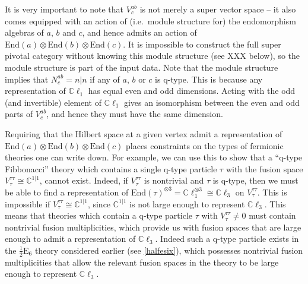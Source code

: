 \documentclass[12pt,a4paper]{article}
\newcommand{\tp}{\otimes}
\newcommand{\cc}{\mathbb{C}}
\newcommand{\End}{\text{End}}
\newcommand{\cl}{\mathbb{C}\ell}
\newcommand{\ethan}[1]{{\color{amethyst}\footnotesize{(EL) #1}}}
\newcommand{\halfesix}{\frac{1}{2}\text{E}_6}
\begin{document}
It is very important to note that $V^{ab}_c$ is not merely a super vector space -- it also comes equipped with an action
of (i.e.\ module structure for) the endomorphism algebras of $a$, $b$ and $c$, and hence admits an action of $\End(a)\tp \End(b)\tp \End(c)$. 
It is impossible to construct the full super pivotal category without knowing this module structure (see XXX below), 
so the module
structure is part of the input data.
Note that the module structure implies that $N^{ab}_c = n|n$ if any of $a$, $b$ or $c$ is q-type.
This is because any representation of $\cl_1$ has equal even and odd dimensions.
Acting with the odd (and invertible) element of $\cl_1$ gives an isomorphism between the even and odd parts of $V^{ab}_c$, and hence they must have the same dimension.

Requiring that the Hilbert space at a given vertex admit a 
representation of $\End(a)\tp \End(b)\tp \End(c)$ places constraints on the types 
of fermionic theories one can write down. 
For example, we can use this to show that a ``q-type Fibbonacci'' theory 
which contains a single q-type particle $\tau$ with the fusion space $V^{\tau\tau}_{\tau}\cong \cc^{1|1}$, cannot exist. 
Indeed, if $V^{\tau\tau}_{\tau}$ is nontrivial and $\tau$ is q-type, 
then we must be able to find a representation of $\End(\tau)^{\tp 3} = \cl_1^{\tp 3} \cong \cl_3$ on $V^{\tau\tau}_{\tau}$.
This is impossible if $V^{\tau\tau}_{\tau}\cong \cc^{1|1}$, since $\cc^{1|1}$ is not large enough to represent $\cl_3$. 
This means that theories which contain a q-type particle $\tau$ with $V^{\tau\tau}_{\tau}\neq0$ must contain nontrivial 
fusion multiplicities, which provide us with fusion spaces that are large enough to admit a representation of $\cl_3$.
Indeed such a q-type particle exists in the $\halfesix$ theory considered earlier (see \ref{halfesix}), 
which possesses nontrivial fusion multiplicities that allow the relevant fusion spaces in the theory to be large enough to represent $\cl_3$. 

\end{document}
